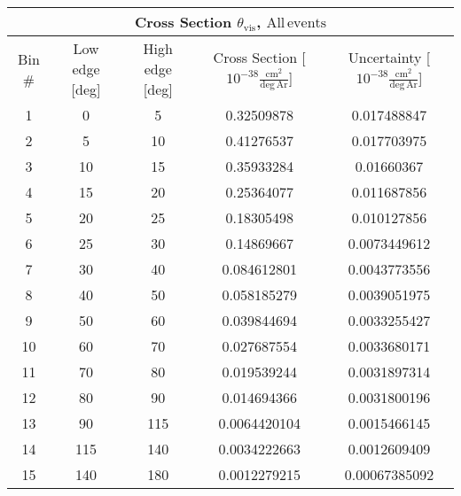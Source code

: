 \begin{table}[H]
\raggedright
\begin{adjustbox}{width=\textwidth}
\small
\begin{tabular}{ |c|c|c|c|c| }
\hline
\multicolumn{5}{|c|}{Cross Section $\theta_{\mathrm{vis}}$, $\mathrm{All\,events}$} \\
\hline
\hline
Bin \# & Low edge [deg] & High edge [deg] & Cross Section [$10^{-38}\frac{\mathrm{cm}^{2}}{\mathrm{deg}\,\mathrm{Ar}}$] & Uncertainty [$10^{-38}\frac{\mathrm{cm}^{2}}{\mathrm{deg}\,\mathrm{Ar}}$] \\
\hline
\hline
1 & 0 & 5 & 0.32509878 & 0.017488847\\
2 & 5 & 10 & 0.41276537 & 0.017703975\\
3 & 10 & 15 & 0.35933284 & 0.01660367\\
4 & 15 & 20 & 0.25364077 & 0.011687856\\
5 & 20 & 25 & 0.18305498 & 0.010127856\\
6 & 25 & 30 & 0.14869667 & 0.0073449612\\
7 & 30 & 40 & 0.084612801 & 0.0043773556\\
8 & 40 & 50 & 0.058185279 & 0.0039051975\\
9 & 50 & 60 & 0.039844694 & 0.0033255427\\
10 & 60 & 70 & 0.027687554 & 0.0033680171\\
11 & 70 & 80 & 0.019539244 & 0.0031897314\\
12 & 80 & 90 & 0.014694366 & 0.0031800196\\
13 & 90 & 115 & 0.0064420104 & 0.0015466145\\
14 & 115 & 140 & 0.0034222663 & 0.0012609409\\
15 & 140 & 180 & 0.0012279215 & 0.00067385092\\
\hline
\end{tabular}
\end{adjustbox}
\end{table}


